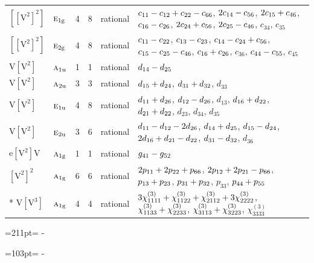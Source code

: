 \documentclass[10pt,a4paper]{article}
\newcommand{\needspace}[1]{\par\penalty-100\begingroup\dimen0=#1\relax\dimen2=\pagegoal
  \advance\dimen2-\pagetotal\ifdim\dimen0>\dimen2\relax\ifdim\dimen2>0pt\vfil\break\fi\fi
  \endgroup}
\numberwithin{equation}{section}
\newcommand{\irr}[1]{\text{\normalfont\scshape #1}}
\newcommand{\ptag}[1]{\mathrm{#1}}
\newcommand{\jahn}[1]{\mathrm{#1}}
\newlength{\fillwidth}\newlength{\cellwidth}\newlength{\colwidth}
\newcommand{\signbreak}{\penalty100\relax}
\begin{document}
{\begin{longtable}{@{}llrrl>{\RaggedRight\arraybackslash}p{\fillwidth}@{}}
$\jahn{[[V^{2}]^{2}]}$ & $\irr{e}_{1\ptag{g}}$ & 4 & 8 & rational & $c_{11} -\signbreak c_{12} +\signbreak c_{22} -\signbreak c_{66}$, $2c_{14} -\signbreak c_{56}$, $2c_{15} +\signbreak c_{46}$, $c_{16} -\signbreak c_{26}$, $2c_{24} +\signbreak c_{56}$, $2c_{25} -\signbreak c_{46}$, $c_{34}$, $c_{35}$\\
$\jahn{[[V^{2}]^{2}]}$ & $\irr{e}_{2\ptag{g}}$ & 4 & 8 & rational & $c_{11} -\signbreak c_{22}$, $c_{13} -\signbreak c_{23}$, $c_{14} -\signbreak c_{24} +\signbreak c_{56}$, $c_{15} -\signbreak c_{25} -\signbreak c_{46}$, $c_{16} +\signbreak c_{26}$, $c_{36}$, $c_{44} -\signbreak c_{55}$, $c_{45}$\\
$\jahn{V[V^{2}]}$ & $\irr{a}_{1\ptag{u}}$ & 1 & 1 & rational & $d_{14} -\signbreak d_{25}$\\
$\jahn{V[V^{2}]}$ & $\irr{a}_{2\ptag{u}}$ & 3 & 3 & rational & $d_{15} +\signbreak d_{24}$, $d_{31} +\signbreak d_{32}$, $d_{33}$\\
$\jahn{V[V^{2}]}$ & $\irr{e}_{1\ptag{u}}$ & 4 & 8 & rational & $d_{11} +\signbreak d_{26}$, $d_{12} -\signbreak d_{26}$, $d_{13}$, $d_{16} +\signbreak d_{22}$, $d_{21} +\signbreak d_{22}$, $d_{23}$, $d_{34}$, $d_{35}$\\
$\jahn{V[V^{2}]}$ & $\irr{e}_{2\ptag{u}}$ & 3 & 6 & rational & $d_{11} -\signbreak d_{12} -\signbreak 2d_{26}$, $d_{14} +\signbreak d_{25}$, $d_{15} -\signbreak d_{24}$, $2d_{16} +\signbreak d_{21} -\signbreak d_{22}$, $d_{31} -\signbreak d_{32}$, $d_{36}$\\
$\jahn{e[V^{2}]V}$ & $\irr{a}_{1\ptag{g}}$ & 1 & 1 & rational & $\mathnormal{g}_{41} -\signbreak \mathnormal{g}_{52}$\\
$\jahn{[V^{2}]^{2}}$ & $\irr{a}_{1\ptag{g}}$ & 6 & 6 & rational & $2p_{11} +\signbreak 2p_{22} +\signbreak p_{66}$, $2p_{12} +\signbreak 2p_{21} -\signbreak p_{66}$, $p_{13} +\signbreak p_{23}$, $p_{31} +\signbreak p_{32}$, $p_{33}$, $p_{44} +\signbreak p_{55}$\\*
$\jahn{V[V^{3}]}$ & $\irr{a}_{1\ptag{g}}$ & 4 & 4 & rational & $3\chi^{(3)}_{1111} +\signbreak \chi^{(3)}_{1122} +\signbreak \chi^{(3)}_{2112} +\signbreak 3\chi^{(3)}_{2222}$, $\chi^{(3)}_{1133} +\signbreak \chi^{(3)}_{2233}$, $\chi^{(3)}_{3113} +\signbreak \chi^{(3)}_{3223}$, $\chi^{(3)}_{3333}$\\
\bottomrule\end{longtable}}
\needspace{211pt}
\needspace{103pt}
\end{document}
